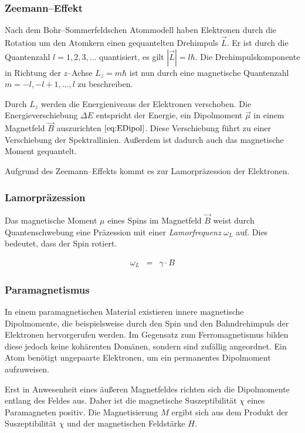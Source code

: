 \documentclass[12pt,a4paper]{scrartcl}
\numberwithin{equation}{section} %
\begin{document}
\hypertarget{zeemanneffekt}{\subsubsection{Zeemann--Effekt}\label{zeemanneffekt}}

Nach dem Bohr--Sommerfeldschen Atommodell haben Elektronen durch die Rotation um den Atomkern einen gequantelten Drehimpuls $\vec{L}$. Er ist durch die Quantenzahl $l=1,2,3,\dots$ quantisiert, es gilt $|\vec{L}| = l\hbar$. Die Drehimpulskomponente in Richtung der $z$--Achse $L_z=m\hbar$ ist nun durch eine magnetische Quantenzahl $m=-l,-l+1,\dots,l$ zu beschreiben.

Durch $L_z$ werden die Energieniveaus der Elektronen verschoben. Die Energieverschiebung $\Delta E$ entspricht der Energie, ein Dipolmoment $\vec \mu$ in einem Magnetfeld $\vec B$ auszurichten $\eqref{eq:EDipol}$. Diese Verschiebung führt zu einer Verschiebung der Spektrallinien. Außerdem ist dadurch auch das magnetische Moment gequantelt.

Aufgrund des Zeemann--Effekts kommt es zur Lamorpräzession der Elektronen.

\hypertarget{lamorpruxe4zession}{%
	\subsubsection{Lamorpräzession}\label{lamorpruxe4zession}}

Das magnetische Moment $\mu$ eines Spins im Magnetfeld $\vec{B}$ weist durch Quantenschwebung eine Präzession mit einer \emph{Lamorfrequenz} $\omega_L$ auf. Dies bedeutet, dass der Spin rotiert.

\begin{eqnarray}
	\omega_L &=& \gamma\cdot B
\end{eqnarray}

\subsubsection{Paramagnetismus}
\label{Paramagnetismus}

In einem paramagnetischen Material existieren innere magnetische Dipolmomente, die beispielsweise durch den Spin und den Bahndrehimpuls der Elektronen hervorgerufen werden. Im Gegensatz zum Ferromagnetismus bilden diese jedoch keine kohärenten Domänen, sondern sind zufällig angeordnet. Ein Atom benötigt ungepaarte Elektronen, um ein permanentes Dipolmoment aufzuweisen.

Erst in Anwesenheit eines äußeren Magnetfeldes richten sich die Dipolmomente entlang des Feldes aus. Daher ist die magnetische Suszeptibilität $\chi$ eines Paramagneten positiv. Die Magnetisierung $M$ ergibt sich aus dem Produkt der Suszeptibilität $\chi$ und der magnetischen Feldstärke $H$.
\end{document}
